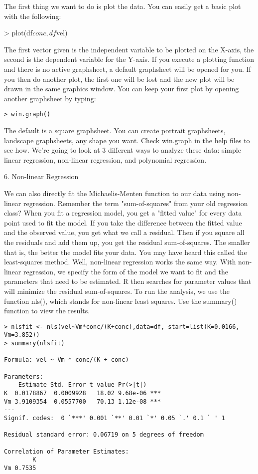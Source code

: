 The first thing we want to do is plot the data. You can easily get a basic plot with the following:

> plot(df$conc, df$vel)

The first vector given is the independent variable to be plotted on the X-axis, the second is the dependent variable for the Y-axis. If you execute a plotting function and there is no active graphsheet, a default graphsheet will be opened for you. If you then do another plot, the first one will be lost and the new plot will be drawn in the 
same graphics window. You can keep your first plot by opening another graphsheet by typing: 

\begin{verbatim}
> win.graph()
\end{verbatim}
The default is a square graphsheet. You can create portrait graphsheets, landscape graphsheets, any shape you want. Check win.graph in the help files to see how. 
We're going to look at 3 different ways to analyze these data: simple linear regression, non-linear regression, and polynomial regression. 


6. Non-linear Regression


We can also directly fit the Michaelis-Menten function to our data using non-linear regression. Remember the term "sum-of-squares" from your old regression class? When you fit a regression model, you get a "fitted value" for every data point used to fit the model. If you take the difference between the fitted value and the observed value, you get what we call a residual. Then if you square all the residuals and add them up, you get the residual sum-of-squares. The smaller that is, the better the model fits your data. You may have heard this called the least-squares method. Well, non-linear regression works the same way. With non-linear regression, we specify the form of the model we want to fit and the parameters that need to be estimated. R then searches for parameter values that will minimize the residual sum-of-squares. 
To run the analysis, we use the function nls(), which stands for non-linear least squares. Use the summary() function to view the results. 
\begin{framed}
\begin{verbatim}
> nlsfit <- nls(vel~Vm*conc/(K+conc),data=df, start=list(K=0.0166, Vm=3.852))
> summary(nlsfit)

Formula: vel ~ Vm * conc/(K + conc)

Parameters:
    Estimate Std. Error t value Pr(>|t|)    
K  0.0178867  0.0009928   18.02 9.68e-06 ***
Vm 3.9109354  0.0557700   70.13 1.12e-08 ***
---
Signif. codes:  0 `***' 0.001 `**' 0.01 `*' 0.05 `.' 0.1 ` ' 1 

Residual standard error: 0.06719 on 5 degrees of freedom

Correlation of Parameter Estimates:
        K
Vm 0.7535 
\end{verbatim}
\end{framed}

